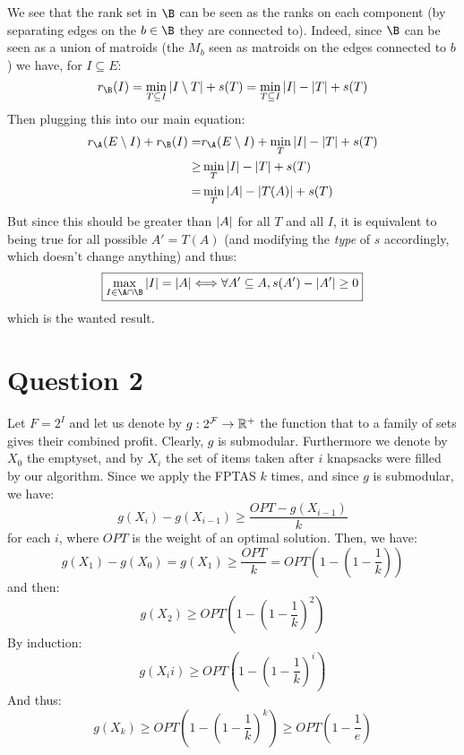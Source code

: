 \documentclass[math, info]{cours}
\begin{document}
We see that the rank set in $\B$ can be seen as the ranks on each component (by separating edges on the $b \in \B$ they are connected to).
Indeed, since $\B$ can be seen as a union of matroids (the $M_{b}$ seen as matroids on the edges connected to $b$) we have, for $I \subseteq E$:
\begin{equation*}
	r_{\B}(I) = \min_{T \subseteq I} \abs{I\setminus T} + s(T) = \min_{T \subseteq I} \abs{I} - \abs{T} + s(T)
\end{equation*}
Then plugging this into our main equation:
\begin{equation*}
	\begin{aligned}
		r_{\A}(E\setminus I)  + r_{\B}(I) =& r_{\A}(E\setminus I) + \min_{T} \abs{I} - \abs{T} + s(T)\\
		\geq & \min_{T} \abs{I} - \abs{T} + s(T)\\
		= & \min_{T} \abs{A} - \abs{T(A)} + s(T)
	\end{aligned}
\end{equation*}
But since this should be greater than $\left|A\right|$ for all $T$ and all $I$, it is equivalent to being true for all possible $A' = T(A)$ (and modifying the \emph{type} of $s$ accordingly, which doesn't change anything) and thus:
\begin{equation*}
	\boxed{\max_{I\in \A \cap \B} \abs{I} = \abs{A} \Longleftrightarrow \forall A'\subseteq A, s(A') - \abs{A'} \geq 0}
\end{equation*}
which is the wanted result.

\section{Question 2}
Let $F = 2^{I}$ and let us denote by $g: 2^{\mathcal{F}} \to \mathbb{R}^{+}$ the function that to a family of sets gives their combined profit.
Clearly, $g$ is submodular.
Furthermore we denote by $X_{0}$ the emptyset, and by $X_{i}$ the set of items taken after $i$ knapsacks were filled by our algorithm.
Since we apply the FPTAS $k$ times, and since $g$ is submodular, we have:
\begin{equation}
	g(X_{i}) - g(X_{i - 1}) \geq \frac{OPT - g(X_{i - 1})}{k}
	\label{eq:induction}
\end{equation}
for each $i$, where $OPT$ is the weight of an optimal solution.
Then, we have:
\begin{equation}
	g(X_{1}) - g(X_{0}) = g(X_{1}) \geq \frac{OPT}{k} = OPT(1 - \left(1 - \frac{1}{k}\right))
	\label{eq:firststep}
\end{equation}
and then:
\begin{equation*}
        g(X_{2}) \geq OPT(1 - \left(1 - \frac{1}{k}\right)^{2})
\end{equation*}
By induction:
\begin{equation*}
        g(X_{i}i) \geq OPT(1 - \left(1 - \frac{1}{k}\right)^{i})
\end{equation*}
And thus:
\begin{equation*}
        g(X_{k}) \geq OPT(1 - \left(1 - \frac{1}{k}\right)^{k}) \geq OPT(1 - \frac{1}{e})
\end{equation*}
\end{document}
